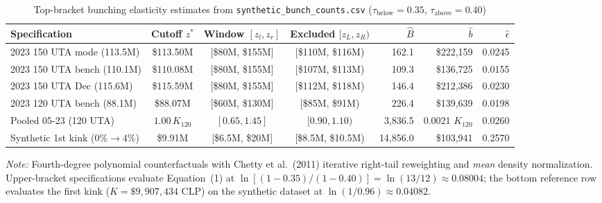 \begin{table}[htbp]
\centering
\caption{Top-bracket bunching elasticity estimates from \texttt{synthetic\_bunch\_counts.csv} ($\tau_{\text{below}}=0.35$, $\tau_{\text{above}}=0.40$)}
\label{tab:p3_bunching}
\small
\begin{adjustbox}{max width=\textwidth}
\begin{tabular}{lcccrrr}
\toprule
Specification & Cutoff $z^*$ & Window $[z_l, z_r]$ & Excluded $[z_L, z_R)$ & $\hat{B}$ & $\hat{b}$ & $\hat{\epsilon}$ \\
\midrule
2023 150 UTA mode (113.5M) & \$113.50M & [\$80M, \$155M] & [\$110M, \$116M) & 162.1 & \$222,159 & 0.0245 \\
2023 150 UTA bench (110.1M) & \$110.08M & [\$80M, \$155M] & [\$107M, \$113M) & 109.3 & \$136,725 & 0.0155 \\
2023 150 UTA Dec (115.6M) & \$115.59M & [\$80M, \$155M] & [\$112M, \$118M) & 146.4 & \$212,386 & 0.0230 \\
2023 120 UTA bench (88.1M) & \$88.07M & [\$60M, \$130M] & [\$85M, \$91M) & 226.4 & \$139,639 & 0.0198 \\
Pooled 05-23 (120 UTA) & $1.00\,K_{120}$ & $[0.65, 1.45]$ & $[0.90, 1.10)$ & 3,836.5 & 0.0021 $K_{120}$ & 0.0260 \\
\midrule
Synthetic 1st kink ($0\%\to 4\%$) & \$9.91M & [\$6.5M, \$20M] & [\$8.5M, \$10.5M) & 14,856.0 & \$103,941 & 0.2570 \\
\bottomrule
\end{tabular}
\end{adjustbox}
\begin{minipage}{\textwidth}
\vspace{4pt}
\footnotesize\textit{Note:} Fourth-degree polynomial counterfactuals with Chetty et al.\ (2011) iterative right-tail reweighting and \textit{mean} density normalization. Upper-bracket specifications evaluate Equation~(1) at $\ln[(1-0.35)/(1-0.40)] = \ln(13/12) \approx 0.08004$; the bottom reference row evaluates the first kink ($K = \$9{,}907{,}434$ CLP) on the synthetic dataset at $\ln(1/0.96) \approx 0.04082$.
\end{minipage}
\end{table}
